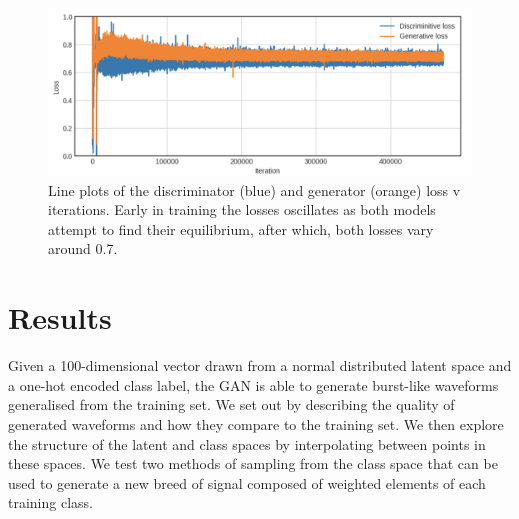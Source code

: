 \documentclass[12pt]{iopart}
\begin{document}
\begin{figure}[h!]
    \centering
    \includegraphics[width=1\textwidth]{Paper_draft/figures/Screenshot 2020-09-11 at 16.52.47.png}
    \caption{Line plots of the discriminator (blue) and generator (orange) loss v iterations. Early in training the losses oscillates as both models attempt to find their equilibrium, after which, both losses vary around 0.7.}
    \label{fig:lossplot}
\end{figure}

\section{Results}

%
Given a 100-dimensional vector drawn from a normal distributed latent space and a one-hot encoded class
label, the GAN is able to generate burst-like waveforms generalised from the
training set. We set out by describing the quality of generated waveforms and
how they compare to the training set. We then explore the structure of the
latent and class spaces by interpolating between points in these spaces. We
test two methods of sampling from the class space that can be used to generate
a new breed of signal composed of weighted elements of each training class.
\end{document}
